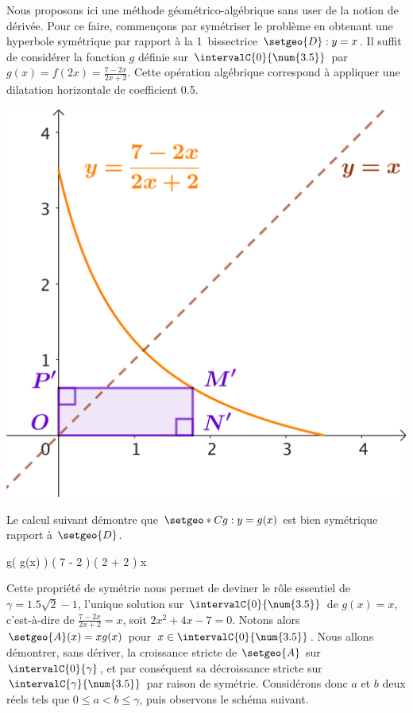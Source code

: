 Nous proposons ici une méthode géométrico-algébrique sans user de la notion de dérivée.
%
Pour ce faire, commençons par symétriser le problème en obtenant une hyperbole symétrique par rapport à la 1\iere\ bissectrice $\setgeo{D}: y = x$.
Il suffit de considérer la fonction $g$ définie sur $\intervalC{0}{\num{3.5}}$ par $g(x) = f(2x) = \frac{7-2x}{2x+2}$. Cette opération algébrique correspond à appliquer une dilatation horizontale de coefficient \num{.5}.

\smallskip

\begin{center}
	\includegraphics[scale=.67]{symmetric-goal.png}
\end{center}

Le calcul suivant démontre que $\setgeo*{C}{g}: y = g(x)$ est bien symétrique rapport à $\setgeo{D}$.

\smallskip
\begin{stepcalc}[style=sar]
	g\big( g(x) \big)
\explnext{}
	     \Big( 7 - 2 \cdot {} \Big)
	\div \Big( 2 \cdot {} + 2 \Big)
\explnext{}
\explnext{}
\explnext{}
	x
\end{stepcalc}
\smallskip




Cette propriété de symétrie nous permet de deviner le rôle essentiel de
$\gamma = \num{1.5} \sqrt{2} - 1$, %
l'unique solution sur $\intervalC{0}{\num{3.5}}$ de 
$g(x) = x$,
c'est-à-dire de 
$\frac{7-2x}{2x+2} = x$,
soit
$2 x^2 + 4 x - 7 = 0$.
%
Notons alors $\setgeo{A}(x) = x g(x)$ pour $x \in \intervalC{0}{\num{3.5}}$.
Nous allons démontrer, sans dériver, la croissance stricte de $\setgeo{A}$ sur $\intervalC{0}{\gamma}$, et par conséquent sa décroissance stricte sur $\intervalC{\gamma}{\num{3.5}}$ par raison de symétrie.
%
Considérons donc $a$ et $b$ deux réels tels que $0 \leq a < b \leq \gamma$, puis observons le schéma suivant.

